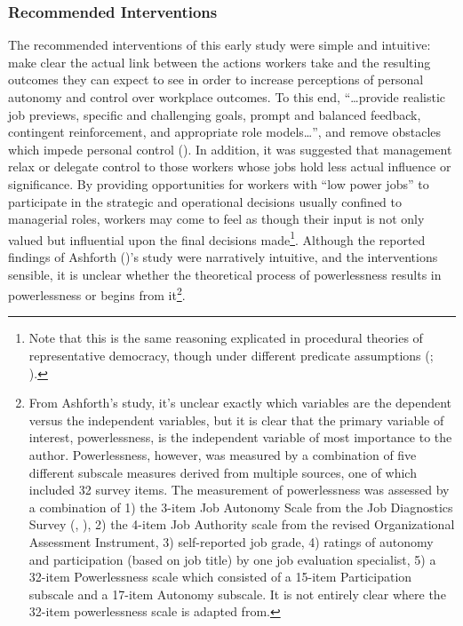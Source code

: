 \documentclass[
  11pt,
  a4paper,
]{article}
\begin{document}
\subsubsection{Recommended
Interventions}\label{recommended-interventions}

The recommended interventions of this early study were simple and
intuitive: make clear the actual link between the actions workers take
and the resulting outcomes they can expect to see in order to increase
perceptions of personal autonomy and control over workplace outcomes. To
this end, ``\ldots provide realistic job previews, specific and
challenging goals, prompt and balanced feedback, contingent
reinforcement, and appropriate role models\ldots{}'', and remove
obstacles which impede personal control
(). In addition, it was
suggested that management relax or delegate control to those workers
whose jobs hold less actual influence or significance. By providing
opportunities for workers with ``low power jobs'' to participate in the
strategic and operational decisions usually confined to managerial
roles, workers may come to feel as though their input is not only valued
but influential upon the final decisions made\footnote{Note that this is
  the same reasoning explicated in procedural theories of representative
  democracy, though under different predicate assumptions
  (; ).}. Although the reported findings of Ashforth
()'s study were narratively intuitive,
and the interventions sensible, it is unclear whether the theoretical
process of powerlessness results in powerlessness or begins from
it\footnote{From Ashforth's study, it's unclear exactly which variables
  are the dependent versus the independent variables, but it is clear
  that the primary variable of interest, powerlessness, is the
  independent variable of most importance to the author. Powerlessness,
  however, was measured by a combination of five different subscale
  measures derived from multiple sources, one of which included 32
  survey items. The measurement of powerlessness was assessed by a
  combination of 1) the 3-item Job Autonomy Scale from the Job
  Diagnostics Survey (, ), 2) the 4-item Job Authority
  scale from the revised Organizational Assessment Instrument, 3)
  self-reported job grade, 4) ratings of autonomy and participation
  (based on job title) by one job evaluation specialist, 5) a 32-item
  Powerlessness scale which consisted of a 15-item Participation
  subscale and a 17-item Autonomy subscale. It is not entirely clear
  where the 32-item powerlessness scale is adapted from.}.
\end{document}
